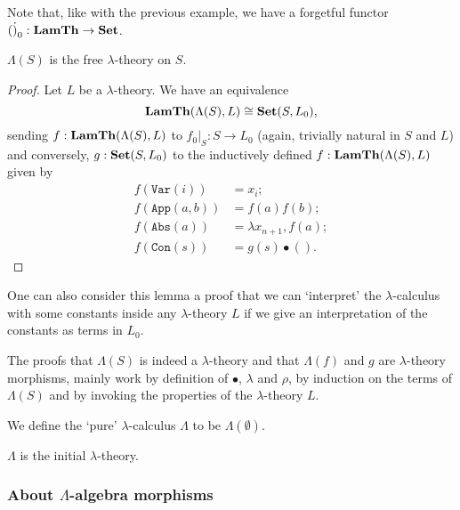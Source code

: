 Note that, like with the previous example, we have a forgetful functor $ (\dot)_0: \mathbf{LamTh} \to \mathbf{Set} $.

\begin{lemma}
  $ \Lambda(S) $ is the free $ \lambda $-theory on $ S $.
\end{lemma}
\begin{proof}
  Let $ L $ be a $ \lambda $-theory. We have an equivalence
  \[ \mathbf{LamTh}(\Lambda(S), L) \cong \mathbf{Set}(S, L_0), \]
  sending $ f: \mathbf{LamTh}(\Lambda(S), L) $ to $ f_0 \vert_S: S \to L_0 $ (again, trivially natural in $ S $ and $ L $) and conversely, $ g: \mathbf{Set}(S, L_0) $ to the inductively defined $ f: \mathbf{LamTh}(\Lambda(S), L) $ given by
  \begin{align*}
    f(\mathtt{Var}(i)) &= x_i;\\
    f(\mathtt{App}(a, b)) &= f(a) f(b);\\
    f(\mathtt{Abs}(a)) &= \lambda x_{n + 1}, f(a);\\
    f(\mathtt{Con}(s)) &= g(s) \bullet ().
  \end{align*}
\end{proof}

\begin{remark}
  One can also consider this lemma a proof that we can `interpret' the $ \lambda $-calculus with some constants inside any $ \lambda $-theory $ L $ if we give an interpretation of the constants as terms in $ L_0 $.
\end{remark}

The proofs that $ \Lambda(S) $ is indeed a $ \lambda $-theory and that $ \Lambda(f) $ and $ g $ are $ \lambda $-theory morphisms, mainly work by definition of $ \bullet $, $ \lambda $ and $ \rho $, by induction on the terms of $ \Lambda(S) $ and by invoking the properties of the $ \lambda $-theory $ L $.

\begin{definition}\label{def:pure-lambda-calculus}
  We define the `pure' $ \lambda $-calculus $ \Lambda $ to be $ \Lambda(\emptyset) $.
\end{definition}

\begin{corollary}
  $ \Lambda $ is the initial $ \lambda $-theory.
\end{corollary}

\subsubsection{About $ \Lambda $-algebra morphisms}

